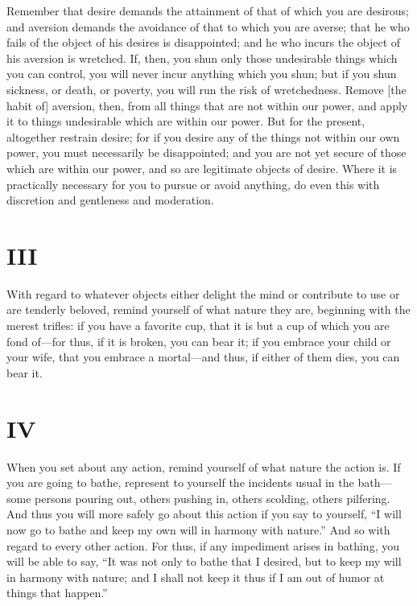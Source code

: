 \documentclass[11pt]{article}
\begin{document}
Remember that desire demands the attainment of that of which you are desirous; and aversion demands the avoidance of that to which you are averse; that he who fails of the object of his desires is disappointed; and he who incurs the object of his aversion is wretched. If, then, you shun only those undesirable things which you can control, you will never incur anything which you shun; but if you shun sickness, or death, or poverty, you will run the risk of wretchedness. Remove [the habit of] aversion, then, from all things that are not within our power, and apply it to things undesirable which are within our power. But for the present, altogether restrain desire; for if you desire any of the things not within our own power, you must necessarily be disappointed; and you are not yet secure of those which are within our power, and so are legitimate objects of desire. Where it is practically necessary for you to pursue or avoid anything, do even this with discretion and gentleness and moderation.

\section*{III}

With regard to whatever objects either delight the mind or contribute to use or are tenderly beloved, remind yourself of what nature they are, beginning with the merest trifles: if you have a favorite cup, that it is but a cup of which you are fond of—for thus, if it is broken, you can bear it; if you embrace your child or your wife, that you embrace a mortal—and thus, if either of them dies, you can bear it.

\section*{IV}

When you set about any action, remind yourself of what nature the action is. If you are going to bathe, represent to yourself the incidents usual in the bath—some persons pouring out, others pushing in, others scolding, others pilfering. And thus you will more safely go about this action if you say to yourself, “I will now go to bathe and keep my own will in harmony with nature.” And so with regard to every other action. For thus, if any impediment arises in bathing, you will be able to say, “It was not only to bathe that I desired, but to keep my will in harmony with nature; and I shall not keep it thus if I am out of humor at things that happen.”
\end{document}
